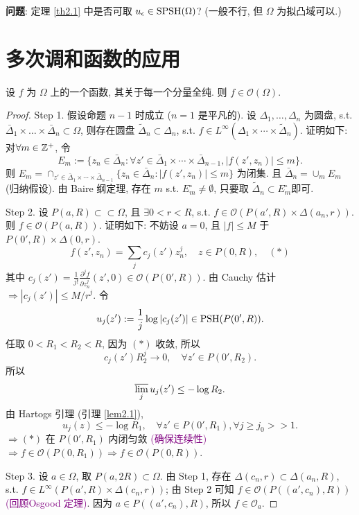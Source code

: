 \noindent \textbf{问题}: 定理 \ref{th2.1} 中是否可取 $u_{\epsilon }\in \operatorname{SPSH}(\Omega )$? (一般不行, 但 $\Omega $ 为拟凸域可以.) 


\section{多次调和函数的应用}

\begin{theorem}[Hartogs]
  设 $f$ 为 $\Omega $ 上的一个函数, 其关于每一个分量全纯. 则 $f \in \mathcal{O}(\Omega )$.   
\end{theorem}
\begin{proof}
  Step 1. 假设命题 $n-1$ 时成立 ($n=1$ 是平凡的). 设 $\Delta _1,\dots,\Delta _n$  为圆盘, s.t. $\bar{\Delta }_1 \times \dots \times \bar{\Delta }_n \subset \Omega $, 则存在圆盘 $\widetilde{\Delta }_n \subset \Delta _n$, s.t. $f \in L^{\infty }(\Delta _1 \times \cdots \times  \widetilde{\Delta }_n)$.    
  证明如下: 对$\forall m \in {\mathbb Z}^{+}$, 令 
  $$E_m := \{z_n \in \bar{\Delta }_n: \forall z' \in \bar{\Delta }_1 \times \cdots \times \bar{\Delta }_{n-1}, \left| f(z',z_n) \right| \leq m\}.$$  
  则 $E_m= \cap _{z' \in \bar{\Delta }_1 \times \cdots \times \bar{\Delta }_{n-1}} \{z_n \in \bar\Delta _n: \left| f(z',z_n) \right| \leq m\}$ 为闭集. 且 $\bar{\Delta }_n= \cup _m E_m$ (归纳假设). 由 Baire 纲定理, 存在 $m$ s.t. $E_{m}^{\circ } \neq \emptyset $, 只要取 $\widetilde{\Delta }_n \subset E_{m}^{\circ }$即可.  
  
  Step 2. 设 $P(a,R) \subset \subset \Omega $, 且 $\exists 0<r<R$, s.t. $f \in \mathcal{O}(P(a',R) \times \Delta (a_n,r))$. 则 $f \in \mathcal{O}(P(a,R))$. 证明如下: 不妨设 $a=0$, 且 $\left| f \right| \leq M$ 于 $P(0',R) \times \Delta (0,r)$.
  $$ f(z',z_n)=\sum_{j}c_j(z')z_{n}^{j}, \quad z \in P(0,R), \quad (*)$$
  其中 $c_j(z')=\frac{1}{j!} \frac{\partial^j f}{\partial z_{n}^{j}}(z',0) \in \mathcal{O}(P(0',R))$.
  由 Cauchy 估计 $\Rightarrow |c_j(z')| \leq M/r^j$.    令 
  $$ u_j(z'):=\frac{1}{j} \log \left| c_j(z') \right| \in \operatorname{PSH}(P(0',R)). $$     
  任取 $0<R_1<R_2<R$, 因为 $(*)$ 收敛, 所以 
  $$ c_j(z')R_{2}^{j} \to 0, \quad \forall z' \in P(0',R_2). $$
  所以 
  $$ \varlimsup_j u_j(z') \leq -\log R_2 .$$
  由 Hartogs 引理 (引理 \ref{lem2.1}), 
  $$ u_j(z) \leq -\log R_1, \quad \forall z' \in P(0',R_1), \forall j \geq j_0 >> 1. $$ 
  $\Rightarrow (*)$ 在 $P(0',R_1)$ 内闭匀敛 \textcolor{purple}{(确保连续性)} $\Rightarrow f \in \mathcal{O}(P(0,R_1)) \Rightarrow f \in \mathcal{O}(P(0,R))$.  

  Step 3. 设 $a \in \Omega $, 取 $P(a,2R) \subset \Omega $. 由 Step 1, 存在 $\Delta (c_n,r) \subset \Delta (a_n,R)$, s.t. $f \in L^{\infty }(P(a',R) \times \Delta (c_n,r))$; 由 Step 2 可知 $f \in \mathcal{O}(P((a',c_n),R))$ \textcolor{purple}{(回顾Osgood 定理)}. 因为 $a \in P((a',c_n),R)$, 所以 $f \in \mathcal{O}_a$.       
\end{proof}


